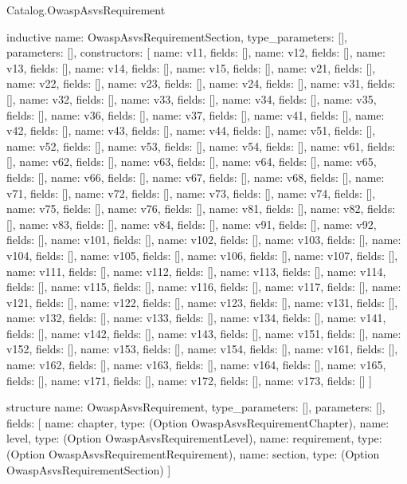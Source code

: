 \begin{lexlean}{Catalog.OwaspAsvsRequirement}
\begin{semanticmodule}
inductive{
  name: OwaspAsvsRequirementSection,
  type_parameters: [],
  parameters: [],
  constructors: [
    {name: v11, fields: []},
    {name: v12, fields: []},
    {name: v13, fields: []},
    {name: v14, fields: []},
    {name: v15, fields: []},
    {name: v21, fields: []},
    {name: v22, fields: []},
    {name: v23, fields: []},
    {name: v24, fields: []},
    {name: v31, fields: []},
    {name: v32, fields: []},
    {name: v33, fields: []},
    {name: v34, fields: []},
    {name: v35, fields: []},
    {name: v36, fields: []},
    {name: v37, fields: []},
    {name: v41, fields: []},
    {name: v42, fields: []},
    {name: v43, fields: []},
    {name: v44, fields: []},
    {name: v51, fields: []},
    {name: v52, fields: []},
    {name: v53, fields: []},
    {name: v54, fields: []},
    {name: v61, fields: []},
    {name: v62, fields: []},
    {name: v63, fields: []},
    {name: v64, fields: []},
    {name: v65, fields: []},
    {name: v66, fields: []},
    {name: v67, fields: []},
    {name: v68, fields: []},
    {name: v71, fields: []},
    {name: v72, fields: []},
    {name: v73, fields: []},
    {name: v74, fields: []},
    {name: v75, fields: []},
    {name: v76, fields: []},
    {name: v81, fields: []},
    {name: v82, fields: []},
    {name: v83, fields: []},
    {name: v84, fields: []},
    {name: v91, fields: []},
    {name: v92, fields: []},
    {name: v101, fields: []},
    {name: v102, fields: []},
    {name: v103, fields: []},
    {name: v104, fields: []},
    {name: v105, fields: []},
    {name: v106, fields: []},
    {name: v107, fields: []},
    {name: v111, fields: []},
    {name: v112, fields: []},
    {name: v113, fields: []},
    {name: v114, fields: []},
    {name: v115, fields: []},
    {name: v116, fields: []},
    {name: v117, fields: []},
    {name: v121, fields: []},
    {name: v122, fields: []},
    {name: v123, fields: []},
    {name: v131, fields: []},
    {name: v132, fields: []},
    {name: v133, fields: []},
    {name: v134, fields: []},
    {name: v141, fields: []},
    {name: v142, fields: []},
    {name: v143, fields: []},
    {name: v151, fields: []},
    {name: v152, fields: []},
    {name: v153, fields: []},
    {name: v154, fields: []},
    {name: v161, fields: []},
    {name: v162, fields: []},
    {name: v163, fields: []},
    {name: v164, fields: []},
    {name: v165, fields: []},
    {name: v171, fields: []},
    {name: v172, fields: []},
    {name: v173, fields: []}
  ]
}

structure{
  name: OwaspAsvsRequirement,
  type_parameters: [],
  parameters: [],
  fields: [
    {name: chapter, type: (Option OwaspAsvsRequirementChapter)},
    {name: level, type: (Option OwaspAsvsRequirementLevel)},
    {name: requirement, type: (Option OwaspAsvsRequirementRequirement)},
    {name: section, type: (Option OwaspAsvsRequirementSection)}
  ]
}
\end{semanticmodule}
\end{lexlean}
